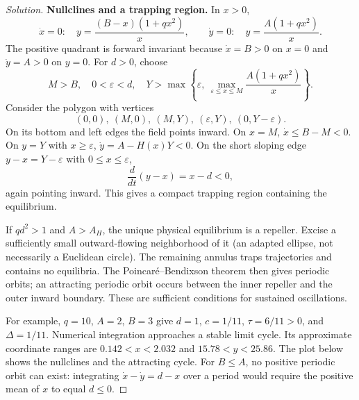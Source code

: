 \documentclass[10pt]{amsart}
\newenvironment{solution}
{\begin{proof}[Solution]}
{\end{proof}}
\begin{document}
\begin{onehalfspace}
\begin{solution}
\textbf{Nullclines and a trapping region.} In $x>0$,
\[
 \dot x=0:\quad y=\frac{(B-x)(1+qx^2)}x,
 \qquad
 \dot y=0:\quad y=\frac{A(1+qx^2)}x.
\]
The positive quadrant is forward invariant because $\dot x=B>0$ on $x=0$ and $\dot y=A>0$ on $y=0$. For $d>0$, choose
\[
 M>B,\quad 0<\varepsilon<d,\quad
 Y>\max\left\{\varepsilon,\ \max_{\varepsilon\leq x\leq M}\frac{A(1+qx^2)}x\right\}.
\]
Consider the polygon with vertices
\[
 (0,0),\ (M,0),\ (M,Y),\ (\varepsilon,Y),\ (0,Y-\varepsilon).
\]
On its bottom and left edges the field points inward. On $x=M$, $\dot x\leq B-M<0$. On $y=Y$ with $x\geq\varepsilon$, $\dot y=A-H(x)Y<0$. On the short sloping edge $y-x=Y-\varepsilon$ with $0\leq x\leq\varepsilon$,
\[
 \frac{d}{dt}(y-x)=x-d<0,
\]
again pointing inward. This gives a compact trapping region containing the equilibrium.

If $qd^2>1$ and $A>A_H$, the unique physical equilibrium is a repeller. Excise a sufficiently small outward-flowing neighborhood of it (an adapted ellipse, not necessarily a Euclidean circle). The remaining annulus traps trajectories and contains no equilibria. The Poincar\'e--Bendixson theorem then gives periodic orbits; an attracting periodic orbit occurs between the inner repeller and the outer inward boundary. These are sufficient conditions for sustained oscillations.

For example, $q=10$, $A=2$, $B=3$ give $d=1$, $c=1/11$, $\tau=6/11>0$, and $\Delta=1/11$. Numerical integration approaches a stable limit cycle. Its approximate coordinate ranges are $0.142<x<2.032$ and $15.78<y<25.86$. The plot below shows the nullclines and the attracting cycle. For $B\leq A$, no positive periodic orbit can exist: integrating $\dot x-\dot y=d-x$ over a period would require the positive mean of $x$ to equal $d\leq0$.


\end{solution}
\end{onehalfspace}
\end{document}
